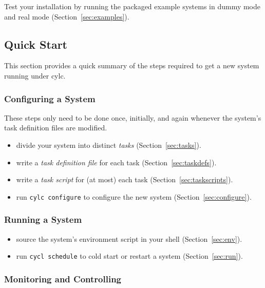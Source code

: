 \documentclass[11pt,a4paper]{article}
\begin{document}
Test your installation by running the packaged example systems in dummy
mode and real mode (Section~\ref{sec:examples}).

\pagebreak
\subsection{Quick Start}

This section provides a quick summary of the steps required to get a new
system running under cylc.

\subsubsection{Configuring a System}

These steps only need to be done once, initially, and again whenever the system's task 
definition files are modified. 

\begin{itemize}
    \item divide your system into distinct {\em tasks} (Section~\ref{sec:tasks}).

    \item write a {\em task definition file} for each task (Section~\ref{sec:taskdefs}).

    \item write a {\em task script} for (at most) each task (Section~\ref{sec:taskscripts}).

    \item run \verb=cylc configure= to configure the new system (Section~\ref{sec:configure}).
\end{itemize}

\subsubsection{Running a System}

\begin{itemize}
    \item source the system's environment script in your shell (Section~\ref{sec:env}).
        
    \item run \verb=cycl schedule= to cold start or restart a system (Section~\ref{sec:run}).
\end{itemize}


\subsubsection{Monitoring and Controlling}
\end{document}
